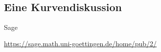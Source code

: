 \documentclass[hyperref={xetex}]{beamer}
\begin{document}
\subsection{Eine Kurvendiskussion}

\begin{frame}[fragile]{Sage}
\begin{center}
\url{https://sage.math.uni-goettingen.de/home/pub/2/}
\end{center}
\end{frame}


%
%
%
%
\end{document}

